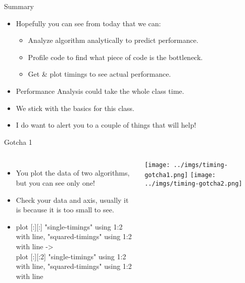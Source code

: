 \documentclass{beamer}
\begin{document}
\begin{frame}{Summary}
\begin{itemize}
\item Hopefully you can see from today that we can:
\begin{itemize}
\item Analyze algorithm analytically to predict performance.
\item Profile code to find what piece of code is the bottleneck.
\item Get \& plot timings to see actual performance.
\end{itemize}
\item Performance Analysis could take the whole class time.
\item We stick with the basics for this class.
\item I do want to alert you to a couple of things that will help!
\end{itemize}
\end{frame}

\begin{frame}{Gotcha 1}
\begin{columns}
\begin{itemize}
\item You plot the data of two algorithms, but you can see only one!
\item <2-> Check your data and axis, usually it is because it is too small to see.
\item <3-> {\tiny plot [:][:] "single-timings" using 1:2 with line, "squared-timings" using 1:2 with line -> \\
plot [:][:2] "single-timings" using 1:2 with line, "squared-timings" using 1:2 with line }

\end{itemize}
 {
\texttt{[image: ../imgs/timing-gotcha1.png]}
}
 {
\texttt{[image: ../imgs/timing-gotcha2.png]}
}
\end{columns}
\end{frame}

\end{document}
